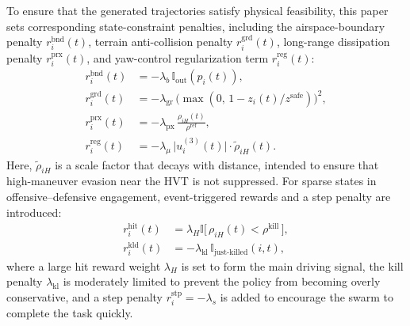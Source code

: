 \documentclass{cja}
\begin{document}
To ensure that the generated trajectories satisfy physical feasibility, this paper sets corresponding state-constraint penalties, including the airspace-boundary penalty $r_i^{\mathrm{bnd}}(t)$, terrain anti-collision penalty $r_i^{\mathrm{grd}}(t)$, long-range dissipation penalty $r_i^{\mathrm{prx}}(t)$, and yaw-control regularization term $r_i^{\mathrm{reg}}(t)$:
\begin{align}
r_i^{\mathrm{bnd}}(t)&=-\lambda_b\,\mathbb{I}_{\mathrm{out}}(p_i(t)),
\label{eq:r-bnd}\\
r_i^{\mathrm{grd}}(t)&=-\lambda_{\mathrm{gr}}\,\bigl(\max(0,\,1-z_i(t)/z^{\mathrm{safe}})\bigr)^{2},
\label{eq:r-grd}\\
r_i^{\mathrm{prx}}(t)&=-\lambda_{\mathrm{px}}\,\frac{\rho_{iH}(t)}{\rho^{\mathrm{ref}}},
\label{eq:r-prx}\\
r_i^{\mathrm{reg}}(t)&=-\lambda_{\mu}\,\bigl|u_i^{(3)}(t)\bigr|\cdot \tilde\rho_{iH}(t).
\label{eq:r-reg}
\end{align}
Here, $\tilde\rho_{iH}$ is a scale factor that decays with distance, intended to ensure that high-maneuver evasion near the HVT is not suppressed. For sparse states in offensive--defensive engagement, event-triggered rewards and a step penalty are introduced:
\begin{equation}
\begin{aligned}
r_i^{\mathrm{hit}}(t)
&=\lambda_H\mathbb{I}\bigl[\,\rho_{iH}(t)<\rho^{\mathrm{kill}}\,\bigr],\\
r_i^{\mathrm{kld}}(t)
&=-\lambda_{\mathrm{kl}}\,\mathbb{I}_{\text{just-killed}}(i,t),
\end{aligned}
\label{eq:r-event}
\end{equation}
where a large hit reward weight $\lambda_H$ is set to form the main driving signal, the kill penalty $\lambda_{\mathrm{kl}}$ is moderately limited to prevent the policy from becoming overly conservative, and a step penalty $r_i^{\mathrm{stp}}=-\lambda_s$ is added to encourage the swarm to complete the task quickly.
\end{document}
